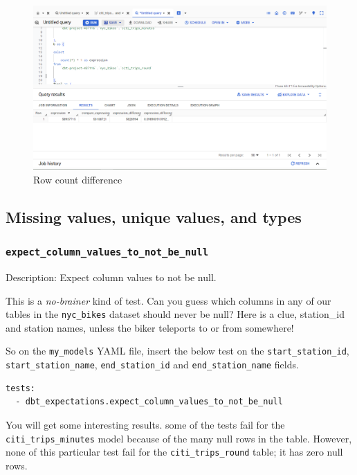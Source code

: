 \documentclass[
]{book}
\begin{document}
\begin{figure}
\centering
\includegraphics{./images/row_count_difference.png}
\caption{Row count difference}
\end{figure}

\hypertarget{missing-values-unique-values-and-types}{%
\subsection{Missing values, unique values, and types}\label{missing-values-unique-values-and-types}}

\hypertarget{expect_column_values_to_not_be_null}{%
\subsubsection{\texorpdfstring{\texttt{expect\_column\_values\_to\_not\_be\_null}}{expect\_column\_values\_to\_not\_be\_null}}\label{expect_column_values_to_not_be_null}}

Description: Expect column values to not be null.

This is a \emph{no-brainer} kind of test. Can you guess which columns in any of our tables in the \texttt{nyc\_bikes} dataset should never be null? Here is a clue, station\_id and station names, unless the biker teleports to or from somewhere!

So on the \texttt{my\_models} YAML file, insert the below test on the \texttt{start\_station\_id}, \texttt{start\_station\_name}, \texttt{end\_station\_id} and \texttt{end\_station\_name} fields.

\begin{verbatim}
tests:
  - dbt_expectations.expect_column_values_to_not_be_null
\end{verbatim}

You will get some interesting results. some of the tests fail for the \texttt{citi\_trips\_minutes} model because of the many null rows in the table. However, none of this particular test fail for the \texttt{citi\_trips\_round} table; it has zero null rows.
\end{document}
